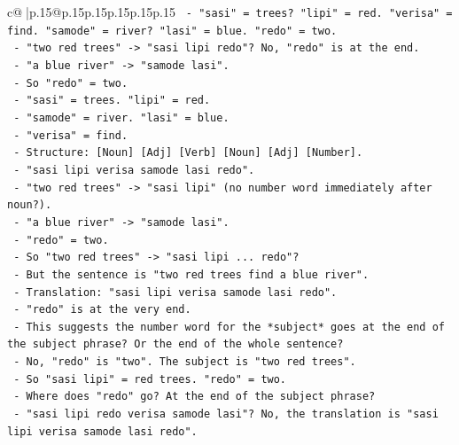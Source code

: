 \documentclass{article}
\begin{document}
{\begin{supertabular}{c@{$\;$}|p{.15\linewidth}@{}p{.15\linewidth}p{.15\linewidth}p{.15\linewidth}p{.15\linewidth}p{.15\linewidth}}
{{{\texttt{                      {-} "sasi" = trees? "lipi" = red. "verisa" = find. "samode" = river? "lasi" = blue. "redo" = two.} \\
\texttt{                      {-} "two red trees" {-}> "sasi lipi redo"? No, "redo" is at the end.} \\
\texttt{                      {-} "a blue river" {-}> "samode lasi".} \\
\texttt{                      {-} So "redo" = two.} \\
\texttt{                      {-} "sasi" = trees. "lipi" = red.} \\
\texttt{                      {-} "samode" = river. "lasi" = blue.} \\
\texttt{                      {-} "verisa" = find.} \\
\texttt{                      {-} Structure: {[}Noun{]} {[}Adj{]} {[}Verb{]} {[}Noun{]} {[}Adj{]} {[}Number{]}.} \\
\texttt{                      {-} "sasi lipi verisa samode lasi redo".} \\
\texttt{                      {-} "two red trees" {-}> "sasi lipi" (no number word immediately after noun?).} \\
\texttt{                      {-} "a blue river" {-}> "samode lasi".} \\
\texttt{                      {-} "redo" = two.} \\
\texttt{                      {-} So "two red trees" {-}> "sasi lipi ... redo"?} \\
\texttt{                      {-} But the sentence is "two red trees find a blue river".} \\
\texttt{                      {-} Translation: "sasi lipi verisa samode lasi redo".} \\
\texttt{                      {-} "redo" is at the very end.} \\
\texttt{                      {-} This suggests the number word for the *subject* goes at the end of the subject phrase? Or the end of the whole sentence?} \\
\texttt{                      {-} No, "redo" is "two". The subject is "two red trees".} \\
\texttt{                      {-} So "sasi lipi" = red trees. "redo" = two.} \\
\texttt{                      {-} Where does "redo" go? At the end of the subject phrase?} \\
\texttt{                      {-} "sasi lipi redo verisa samode lasi"? No, the translation is "sasi lipi verisa samode lasi redo".} \\
}}}
\end{supertabular}}
\end{document}
